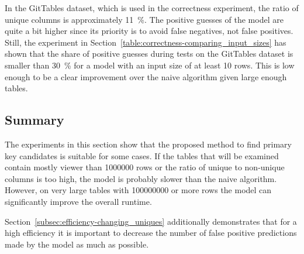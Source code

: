 In the GitTables dataset, which is used in the correctness experiment, the ratio of unique columns is approximately \SI{11}{\percent}. The positive guesses of the model are quite a bit higher since its priority is to avoid false negatives, not false positives. Still, the experiment in Section~\ref{table:correctness-comparing_input_sizes} has shown that the share of positive guesses during tests on the GitTables dataset is smaller than \SI{30}{\percent} for a model with an input size of at least \num{10} rows. This is low enough to be a clear improvement over the naive algorithm given large enough tables.



\subsection{Summary}\label{subsec:efficiency-summary}
The experiments in this section show that the proposed method to find primary key candidates is suitable for some cases. If the tables that will be examined contain mostly viewer than \num{1000000} rows or the ratio of unique to non-unique columns is too high, the model is probably slower than the naive algorithm. However, on very large tables with \num{100000000} or more rows the model can significantly improve the overall runtime. %

Section~\ref{subsec:efficiency-changing_uniques} additionally demonstrates that for a high efficiency it is important to decrease the number of false positive predictions made by the model as much as possible.
